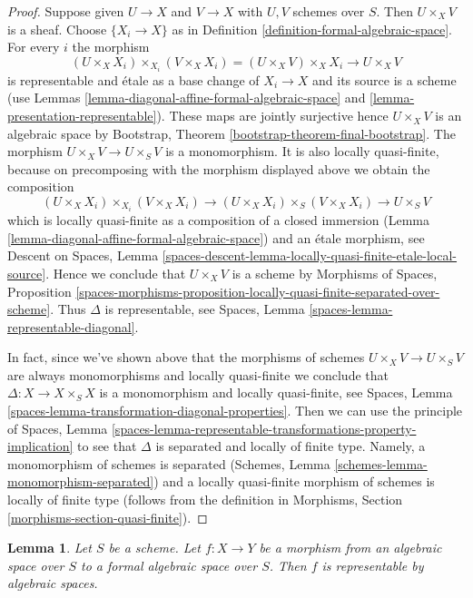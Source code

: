 \documentclass{stacks-project}
\theoremstyle{plain}
\newtheorem{lemma}[subsection]{Lemma}
\theoremstyle{definition}
\theoremstyle{remark}
\numberwithin{equation}{subsection}
\begin{document}
\begin{proof}
Suppose given $U \to X$ and $V \to X$ with $U, V$ schemes over $S$.
Then $U \times_X V$ is a sheaf. Choose $\{X_i \to X\}$ as in
Definition \ref{definition-formal-algebraic-space}.
For every $i$ the morphism
$$
(U \times_X X_i) \times_{X_i} (V \times_X X_i)
= (U \times_X V) \times_X X_i \to U \times_X V
$$
is representable and \'etale as a base change of $X_i \to X$
and its source is a scheme (use
Lemmas \ref{lemma-diagonal-affine-formal-algebraic-space} and
\ref{lemma-presentation-representable}). These maps are jointly surjective
hence $U \times_X V$ is an algebraic space by
Bootstrap, Theorem \ref{bootstrap-theorem-final-bootstrap}.
The morphism $U \times_X V \to U \times_S V$ is a monomorphism.
It is also locally quasi-finite, because on precomposing with
the morphism displayed above we obtain the composition
$$
(U \times_X X_i) \times_{X_i} (V \times_X X_i)
\to (U \times_X X_i) \times_S (V \times_X X_i)
\to U \times_S V
$$
which is locally quasi-finite as a composition of a closed
immersion (Lemma \ref{lemma-diagonal-affine-formal-algebraic-space})
and an \'etale morphism, see
Descent on Spaces, Lemma
\ref{spaces-descent-lemma-locally-quasi-finite-etale-local-source}.
Hence we conclude that $U \times_X V$ is a scheme by
Morphisms of Spaces, Proposition
\ref{spaces-morphisms-proposition-locally-quasi-finite-separated-over-scheme}.
Thus $\Delta$ is representable, see
Spaces, Lemma \ref{spaces-lemma-representable-diagonal}.

\medskip\noindent
In fact, since we've shown above that the morphisms of schemes
$U \times_X V \to U \times_S V$ are always monomorphisms and
locally quasi-finite we conclude that $\Delta : X \to X \times_S X$
is a monomorphism and locally quasi-finite, see
Spaces, Lemma \ref{spaces-lemma-transformation-diagonal-properties}.
Then we can use the principle of
Spaces, Lemma
\ref{spaces-lemma-representable-transformations-property-implication}
to see that $\Delta$ is separated and locally of finite type.
Namely, a monomorphism of schemes is separated
(Schemes, Lemma \ref{schemes-lemma-monomorphism-separated})
and a locally quasi-finite morphism of schemes is
locally of finite type
(follows from the definition in
Morphisms, Section \ref{morphisms-section-quasi-finite}).
\end{proof}

\begin{lemma}
\label{lemma-space-to-formal-space}
Let $S$ be a scheme. Let $f : X \to Y$ be a morphism from an
algebraic space over $S$ to a formal algebraic space over $S$.
Then $f$ is representable by algebraic spaces.
\end{lemma}
\end{document}
